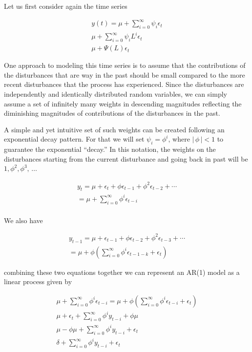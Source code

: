 \documentclass[
  11pt,
]{article}
\begin{document}
Let us first consider again the time series

\begin{gather*}
y(t) = \mu + \sum\limits_{i= 0}^{\infty}\psi_{i}\epsilon_{t} \\[8pt]
\mu + \sum\limits_{i=0}^{\infty}\psi_{i}L^{i}\epsilon_{t} \\[8pt]
\mu + \Psi(L)\epsilon_{t}
\end{gather*}

One approach to modeling this time series is to assume that the
contributions of the disturbances that are way in the past should be
small compared to the more recent disturbances that the process has
experienced. Since the disturbances are independently and identically
distributed random variables, we can simply assume a set of infinitely
many weights in descending magnitudes reflecting the diminishing
magnitudes of contributions of the disturbances in the past.

A simple and yet intuitive set of such weights can be created following
an exponential decay pattern. For that we will set
\(\psi_{i} = \phi^{i}\), where \(\left|\,\phi\,\right| < 1\) to
guarantee the exponential ``decay.'' In this notation, the weights on
the disturbances starting from the current disturbance and going back in
past will be \(1, \phi^{2}, \phi^{3},\, \ldots\)

\begin{gather*}
y_{t} = \mu + \epsilon_{t} + \phi\epsilon_{t-1} + \phi^{2}\epsilon_{t-2} + \cdots\\[8pt]
= \mu + \sum\limits_{i=0}^{\infty}\phi^{i}\epsilon_{t-i}
\\[8pt]
\end{gather*}

We also have

\begin{gather*}
y_{t-1} = \mu + \epsilon_{t-1} + \phi\epsilon_{t-2} + \phi^{2}\epsilon_{t-3} + \cdots \\[8pt]
= \mu + \phi\left(\sum\limits_{i=0}^{\infty}\phi^{i}\epsilon_{t-1-k} + \epsilon_{t}\right)
\end{gather*}

combining these two equations together we can represent an AR(1) model
as a linear process given by

\begin{gather*}
\mu + \sum\limits_{i=0}^{\infty}\phi^{i}\epsilon_{t-i} = \mu + \phi\left(\sum\limits_{i=0}^{\infty}\phi^{i}\epsilon_{t-i} + \epsilon_{t}\right) \\[8pt]
\mu + \epsilon_{t} + \sum\limits_{i=0}^{\infty}\phi^{i}y_{t-i} + \phi\mu \\[8pt]
\mu - \phi\mu + \sum\limits_{i=0}^{\infty}\phi^{i}y_{t-i} + \epsilon_{t} \\[8pt]
\delta + \sum\limits_{i=0}^{\infty}\phi^{i}y_{t- i} + \epsilon_{t}
\end{gather*}
\end{document}
